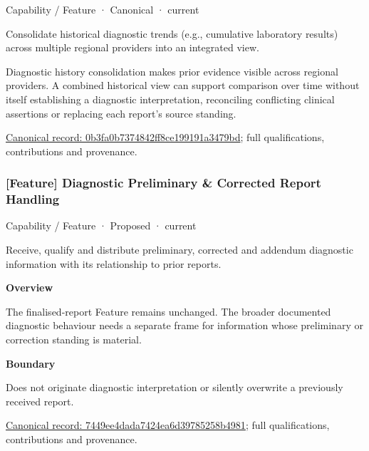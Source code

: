 \label{element:0b3fa0b7374842ff8ce199191a3479bd}
{\small Capability / Feature · Canonical · current}\par

Consolidate historical diagnostic trends (e.g., cumulative laboratory results) across multiple regional providers into an integrated view.



Diagnostic history consolidation makes prior evidence visible across regional providers. A combined historical view can support comparison over time without itself establishing a diagnostic interpretation, reconciling conflicting clinical assertions or replacing each report's source standing.


{\footnotesize \href{../../../../continuum/strategy/capability/feature/0b3fa0b7374842ff8ce199191a3479bd.md}{Canonical record: 0b3fa0b7374842ff8ce199191a3479bd}; full qualifications, contributions and provenance.}\par
\subsubsection{[Feature] Diagnostic Preliminary \& Corrected Report Handling}

\label{element:7449ee4dada7424ea6d39785258b4981}
{\small Capability / Feature · Proposed · current}\par

Receive, qualify and distribute preliminary, corrected and addendum diagnostic information with its relationship to prior reports.



\textbf{Overview}



The finalised-report Feature remains unchanged. The broader documented diagnostic behaviour needs a separate frame for information whose preliminary or correction standing is material.



\textbf{Boundary}



Does not originate diagnostic interpretation or silently overwrite a previously received report.


{\footnotesize \href{../../../../continuum/strategy/capability/feature/7449ee4dada7424ea6d39785258b4981.md}{Canonical record: 7449ee4dada7424ea6d39785258b4981}; full qualifications, contributions and provenance.}\par
